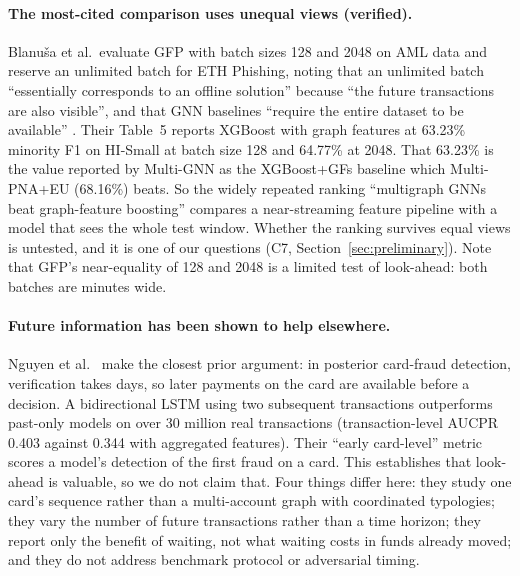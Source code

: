 \documentclass[11pt,a4paper]{article}
\begin{document}
\paragraph{The most-cited comparison uses unequal views (verified).} Blanu\v{s}a et al.\ evaluate GFP with batch sizes 128 and 2048 on AML data and reserve an unlimited batch for ETH Phishing, noting that an unlimited batch ``essentially corresponds to an offline solution'' because ``the future transactions are also visible'', and that GNN baselines ``require the entire dataset to be available'' \cite{blanusa2024gfp}. Their Table~5 reports XGBoost with graph features at 63.23\% minority F1 on HI-Small at batch size 128 and 64.77\% at 2048. That 63.23\% is the value reported by Multi-GNN as the XGBoost+GFs baseline which Multi-PNA+EU (68.16\%) beats. So the widely repeated ranking ``multigraph GNNs beat graph-feature boosting'' compares a near-streaming feature pipeline with a model that sees the whole test window. Whether the ranking survives equal views is untested, and it is one of our questions (C7, Section~\ref{sec:preliminary}). Note that GFP's near-equality of 128 and 2048 is a limited test of look-ahead: both batches are minutes wide.

\paragraph{Future information has been shown to help elsewhere.} Nguyen et al.\ \cite{nguyen2022future} make the closest prior argument: in posterior card-fraud detection, verification takes days, so later payments on the card are available before a decision. A bidirectional LSTM using two subsequent transactions outperforms past-only models on over 30 million real transactions (transaction-level AUCPR 0.403 against 0.344 with aggregated features). Their ``early card-level'' metric scores a model's detection of the first fraud on a card. This establishes that look-ahead is valuable, so we do not claim that. Four things differ here: they study one card's sequence rather than a multi-account graph with coordinated typologies; they vary the number of future transactions rather than a time horizon; they report only the benefit of waiting, not what waiting costs in funds already moved; and they do not address benchmark protocol or adversarial timing.
\end{document}
